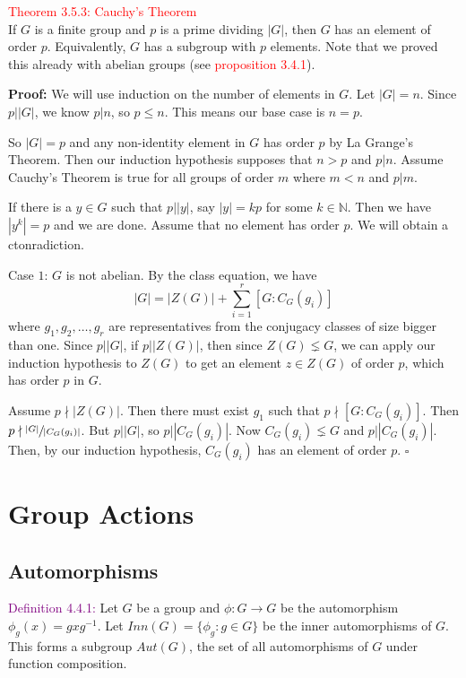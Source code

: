 \documentclass{article}
\begin{document}
\textcolor{red}{Theorem 3.5.3: Cauchy's Theorem}\\
If $G$ is a finite group and $p$ is a prime dividing $|G|$, then $G$ has an element of order $p$. Equivalently, $G$ has a subgroup with 
$p$ elements. Note that we proved this already with abelian groups (see \textcolor{red}{proposition 3.4.1}).

\textbf{Proof:} We will use induction on the number of elements in $G$. Let $|G|=n$. Since $p \big| |G|$, we know $p|n$, so $p \leq n$. 
This means our base case is $n=p$.

So $|G|=p$ and any non-identity element in $G$ has order $p$ by La Grange's Theorem. Then our induction hypothesis supposes that $n>p$ and 
$p|n$. Assume Cauchy's Theorem is true for all groups of order $m$ where $m<n$ and $p|m$.

If there is a $y \in G$ such that $p \big| |y|$, say $|y|=kp$ for some $k \in \mathbb{N}$. Then we have $|y^k|=p$ and we are done. Assume 
that no element has order $p$. We will obtain a ctonradiction.

Case $1$: $G$ is not abelian. By the class equation, we have 
\[
    |G| = |Z(G)| + \sum_{i=1}^r[G:C_G(g_i)]
\]
where $g_1, g_2, \dots, g_r$ are representatives from the conjugacy classes of size bigger than one. Since $p \big||G|$, if 
$p \big| |Z(G)|$, then since $Z(G) \lneq G$, we can apply our induction hypothesis to $Z(G)$ to get an element $z \in Z(G)$ of order $p$, 
which has order $p$ in $G$.

Assume $p \nmid |Z(G)|$. Then there must exist $g_1$ such that $p \nmid [G:C_G(g_i)]$. Then $p \nmid \sfrac{|G|}{|C_G(g_i)|}$. But 
$p \big| |G|$, so $p \big| |C_G(g_i)|$. Now $C_G(g_i) \lneq G$ and $p \big| |C_G(g_i)|$. Then, by our induction hypothesis, $C_G(g_i)$ 
has an element of order $p$. $\square$


\newpage


\section{Group Actions}
\setcounter{subsection}{3}
\subsection{Automorphisms}

\textcolor{purple}{Definition 4.4.1:} Let $G$ be a group and $\phi:G \longrightarrow G$ be the automorphism $\phi_g(x)=gxg^{-1}$. Let 
$Inn(G) = \{ \phi_g:g \in G\}$ be the inner automorphisms of $G$. This forms a subgroup $Aut(G)$, the set of all automorphisms of $G$ 
under function composition.
\end{document}
